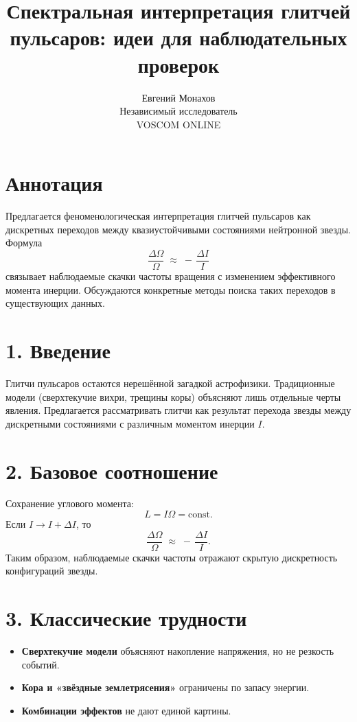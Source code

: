 \documentclass[a4paper,12pt]{article}
\begin{document}
\title{Спектральная интерпретация глитчей пульсаров: идеи для наблюдательных проверок}
\author{Евгений Монахов \\ Независимый исследователь \\ VOSCOM ONLINE}
\date{}
\maketitle

\section*{Аннотация}
Предлагается феноменологическая интерпретация глитчей пульсаров как дискретных переходов между квазиустойчивыми состояниями нейтронной звезды. Формула
\[
\frac{\Delta \Omega}{\Omega} \;\approx\; -\, \frac{\Delta I}{I}
\]
связывает наблюдаемые скачки частоты вращения с изменением эффективного момента инерции. Обсуждаются конкретные методы поиска таких переходов в существующих данных.

\section*{1. Введение}
Глитчи пульсаров остаются нерешённой загадкой астрофизики. Традиционные модели (сверхтекучие вихри, трещины коры) объясняют лишь отдельные черты явления. Предлагается рассматривать глитчи как результат перехода звезды между дискретными состояниями с различным моментом инерции $I$.

\section*{2. Базовое соотношение}
Сохранение углового момента:
\[
L = I \Omega = \text{const}.
\]
Если $I \to I + \Delta I$, то
\[
\frac{\Delta \Omega}{\Omega} \;\approx\; -\, \frac{\Delta I}{I}.
\]
Таким образом, наблюдаемые скачки частоты отражают скрытую дискретность конфигураций звезды.

\section*{3. Классические трудности}
\begin{itemize}
  \item \textbf{Сверхтекучие модели} объясняют накопление напряжения, но не резкость событий.
  \item \textbf{Кора и «звёздные землетрясения»} ограничены по запасу энергии.
  \item \textbf{Комбинации эффектов} не дают единой картины.
\end{itemize}
\end{document}
